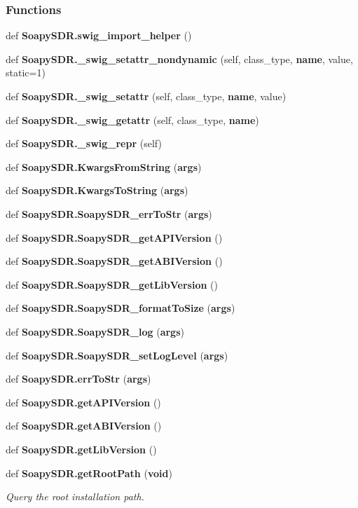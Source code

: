 \subsubsection*{Functions}
\begin{DoxyCompactItemize}
\item 
def {\bf Soapy\+S\+D\+R.\+swig\+\_\+import\+\_\+helper} ()
\item 
def {\bf Soapy\+S\+D\+R.\+\_\+swig\+\_\+setattr\+\_\+nondynamic} (self, class\+\_\+type, {\bf name}, value, static=1)
\item 
def {\bf Soapy\+S\+D\+R.\+\_\+swig\+\_\+setattr} (self, class\+\_\+type, {\bf name}, value)
\item 
def {\bf Soapy\+S\+D\+R.\+\_\+swig\+\_\+getattr} (self, class\+\_\+type, {\bf name})
\item 
def {\bf Soapy\+S\+D\+R.\+\_\+swig\+\_\+repr} (self)
\item 
def {\bf Soapy\+S\+D\+R.\+Kwargs\+From\+String} ({\bf args})
\item 
def {\bf Soapy\+S\+D\+R.\+Kwargs\+To\+String} ({\bf args})
\item 
def {\bf Soapy\+S\+D\+R.\+Soapy\+S\+D\+R\+\_\+err\+To\+Str} ({\bf args})
\item 
def {\bf Soapy\+S\+D\+R.\+Soapy\+S\+D\+R\+\_\+get\+A\+P\+I\+Version} ()
\item 
def {\bf Soapy\+S\+D\+R.\+Soapy\+S\+D\+R\+\_\+get\+A\+B\+I\+Version} ()
\item 
def {\bf Soapy\+S\+D\+R.\+Soapy\+S\+D\+R\+\_\+get\+Lib\+Version} ()
\item 
def {\bf Soapy\+S\+D\+R.\+Soapy\+S\+D\+R\+\_\+format\+To\+Size} ({\bf args})
\item 
def {\bf Soapy\+S\+D\+R.\+Soapy\+S\+D\+R\+\_\+log} ({\bf args})
\item 
def {\bf Soapy\+S\+D\+R.\+Soapy\+S\+D\+R\+\_\+set\+Log\+Level} ({\bf args})
\item 
def {\bf Soapy\+S\+D\+R.\+err\+To\+Str} ({\bf args})
\item 
def {\bf Soapy\+S\+D\+R.\+get\+A\+P\+I\+Version} ()
\item 
def {\bf Soapy\+S\+D\+R.\+get\+A\+B\+I\+Version} ()
\item 
def {\bf Soapy\+S\+D\+R.\+get\+Lib\+Version} ()
\item 
def {\bf Soapy\+S\+D\+R.\+get\+Root\+Path} ({\bf void})
\begin{DoxyCompactList}\small\item\em Query the root installation path. \end{DoxyCompactList}\item 

\end{DoxyCompactItemize}
